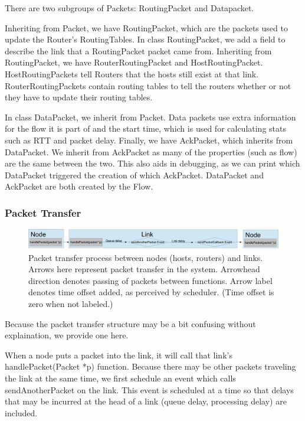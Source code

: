     There are two subgroups of Packets: RoutingPacket and Datapacket. 
    
    Inheriting from Packet, we have RoutingPacket, which are the packets used to update the Router's RoutingTables. In class RoutingPacket, we add a field to describe the link that a RoutingPacket packet came from. 
    Inheriting from RoutingPacket, we have RouterRoutingPacket and HostRoutingPacket. HostRoutingPackets tell Routers that the hosts still exist at that link. RouterRoutingPackets contain routing tables to tell the routers whether or not they have to update their routing tables. 
    
    In class DataPacket, we inherit from Packet. Data packets use extra information for the flow it is part of and the start time, which is used for calculating stats such as RTT and packet delay. Finally, we have AckPacket, which inherits from DataPacket. We inherit from AckPacket as many of the properties (such as flow) are the same between the two. This also aids in debugging, as we can print which DataPacket triggered the creation of which AckPacket. DataPacket and AckPacket are both created by the Flow. 


\subsubsection{Packet Transfer}    
\begin{figure}[htbp]
    \centering
    \includegraphics[width=\textwidth]{packetTransfer.png}
    \caption{Packet transfer process between nodes (hosts, routers) and links. Arrows here represent packet transfer in the system. Arrowhead direction denotes passing of packets between functions. Arrow label denotes time offset added, as perceived by scheduler. (Time offset is zero when not labeled.) }
\end{figure}

Because the packet transfer structure may be a bit confusing without explaination, we provide one here.

When a node puts a packet into the link, it will call that link's handlePacket(Packet *p) function. Because there may be other packets traveling the link at the same time, we first schedule an event which calls sendAnotherPacket on the link. This event is scheduled at a time so that delays that may be incurred at the head of a link (queue delay, processing delay) are included.

